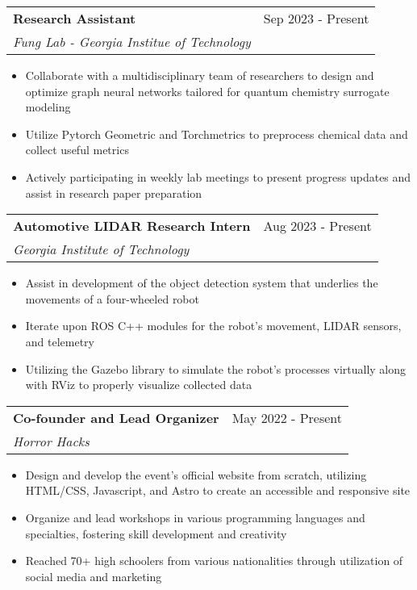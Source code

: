 \documentclass[letterpaper,11pt]{article}
\makeatletter
\newcommand{\resumeItem}[1]{
  \item\small{
    {#1 \vspace{-2pt}}
  }
}
\newcommand{\resumeSubheading}[4]{%
\vspace{-1pt}%
  \item
    \begin{tabular*}{0.97\textwidth}{l@{\extracolsep{\fill}}r}
      \textbf{#1} & #2 \\
      \textit{\small#3} & \textit{\small #4} \\

    \end{tabular*}%
  \vspace{-9pt}
}
\newcommand{\resumeItemListStart}{\begin{itemize}}
\newcommand{\resumeItemListEnd}{\end{itemize}\vspace{-5pt}}
\makeatother
\begin{document}
      \resumeSubheading
        {Research Assistant}{Sep 2023 - Present}
        {Fung Lab - Georgia Institue of Technology}{}
        \resumeItemListStart
          \resumeItem{Collaborate with a multidisciplinary team of researchers to design and optimize graph neural networks tailored for quantum chemistry surrogate modeling}
          \resumeItem{Utilize Pytorch Geometric and Torchmetrics to preprocess chemical data and collect useful metrics}
          \resumeItem{Actively participating in weekly lab meetings to present progress updates and assist in research paper preparation}
        \resumeItemListEnd


      \resumeSubheading
        {Automotive LIDAR Research Intern}{Aug 2023 - Present}
        {Georgia Institute of Technology}{}
        \resumeItemListStart
          \resumeItem{Assist in development of the object detection system that underlies the movements of a four-wheeled robot}
          \resumeItem{Iterate upon ROS C++ modules for the robot's movement, LIDAR sensors, and telemetry}
          \resumeItem{Utilizing the Gazebo library to simulate the robot's processes virtually along with RViz to properly visualize collected data}
        \resumeItemListEnd

      \resumeSubheading
        {Co-founder and Lead Organizer}{May 2022 - Present}
        {Horror Hacks}{}
        \resumeItemListStart
          \resumeItem{Design and develop the event's official website from scratch, utilizing HTML/CSS, Javascript, and Astro to create an accessible and responsive site}
          \resumeItem{Organize and lead workshops in various programming languages and specialties, fostering skill development and creativity}
          \resumeItem{Reached 70+ high schoolers from various nationalities through utilization of social media and marketing}
        \resumeItemListEnd

\end{document}
